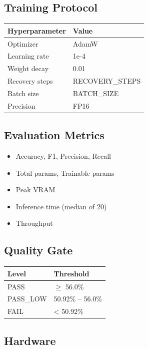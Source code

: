 \subsection{Training Protocol}

\begin{table}[H]
\centering
\small
\begin{tabular}{ll}
\toprule
\textbf{Hyperparameter} & \textbf{Value} \\
\midrule
Optimizer & AdamW \\
Learning rate & 1e-4 \\
Weight decay & 0.01 \\
Recovery steps & {{RECOVERY\_STEPS}} \\
Batch size & {{BATCH\_SIZE}} \\
Precision & FP16 \\
\bottomrule
\end{tabular}
\end{table}

\subsection{Evaluation Metrics}

\begin{itemize}
\item Accuracy, F1, Precision, Recall
\item Total params, Trainable params
\item Peak VRAM
\item Inference time (median of 20)
\item Throughput

\end{itemize}
\subsection{Quality Gate}

\begin{table}[H]
\centering
\small
\begin{tabular}{ll}
\toprule
\textbf{Level} & \textbf{Threshold} \\
\midrule
PASS & $\ge$ 56.0\% \\
PASS\_LOW & 50.92\% -- 56.0\% \\
FAIL & < 50.92\% \\
\bottomrule
\end{tabular}
\end{table}

\subsection{Hardware}

